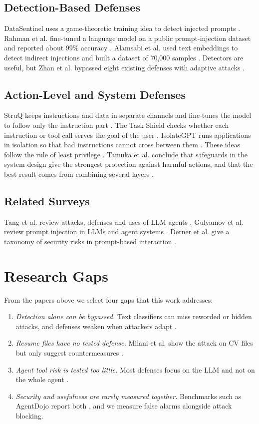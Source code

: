\documentclass[conference]{IEEEtran}
\begin{document}
\subsection{Detection-Based Defenses}
DataSentinel uses a game-theoretic training idea to detect injected prompts \cite{liu2025datasentinel}. Rahman et al. fine-tuned a language model on a public prompt-injection dataset and reported about 99\% accuracy \cite{rahman2025}. Alamsabi et al. used text embeddings to detect indirect injections and built a dataset of 70,000 samples \cite{alamsabi2026}. Detectors are useful, but Zhan et al. bypassed eight existing defenses with adaptive attacks \cite{zhan2025adaptive}.

\subsection{Action-Level and System Defenses}
StruQ keeps instructions and data in separate channels and fine-tunes the model to follow only the instruction part \cite{chen2025struq}. The Task Shield checks whether each instruction or tool call serves the goal of the user \cite{jia2025taskshield}. IsolateGPT runs applications in isolation so that bad instructions cannot cross between them \cite{wu2025isolategpt}. These ideas follow the rule of least privilege \cite{saltzer1975}. Tamuka et al. conclude that safeguards in the system design give the strongest protection against harmful actions, and that the best result comes from combining several layers \cite{tamuka2026}.

\subsection{Related Surveys}
Tang et al. review attacks, defenses and uses of LLM agents \cite{tang2026}. Gulyamov et al. review prompt injection in LLMs and agent systems \cite{gulyamov2026}. Derner et al. give a taxonomy of security risks in prompt-based interaction \cite{derner2024}.

\section{Research Gaps}
From the papers above we select four gaps that this work addresses:
\begin{enumerate}
    \item \textit{Detection alone can be bypassed.} Text classifiers can miss reworded or hidden attacks, and defenses weaken when attackers adapt \cite{zhan2025adaptive, tamuka2026}.
    \item \textit{Resume files have no tested defense.} Milani et al. show the attack on CV files but only suggest countermeasures \cite{milani2026}.
    \item \textit{Agent tool risk is tested too little.} Most defenses focus on the LLM and not on the whole agent \cite{tamuka2026}.
    \item \textit{Security and usefulness are rarely measured together.} Benchmarks such as AgentDojo report both \cite{debenedetti2024agentdojo}, and we measure false alarms alongside attack blocking.
\end{enumerate}
\end{document}
